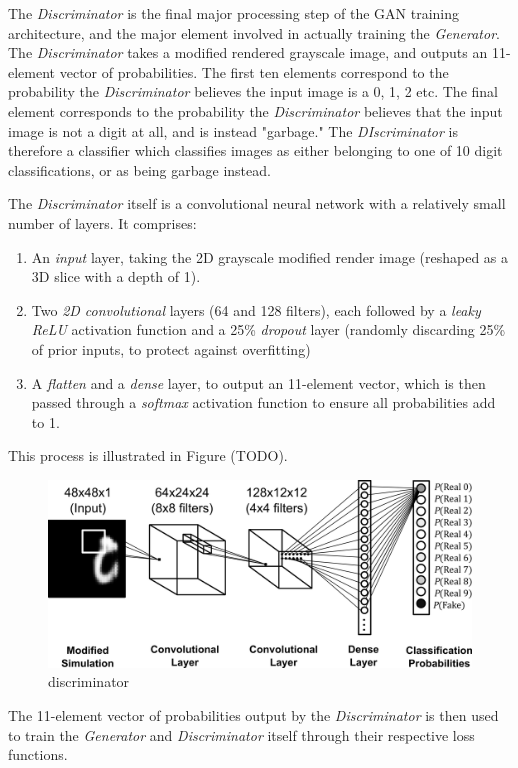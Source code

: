 \documentclass[a4paper,11pt,openany]{book}
\begin{document}
The \emph{Discriminator} is the final major processing step of the GAN training architecture, and the major element involved in actually training the \emph{Generator}.
The \emph{Discriminator} takes a modified rendered grayscale image, and outputs an 11-element vector of probabilities.
The first ten elements correspond to the probability the \emph{Discriminator} believes the input image is a 0, 1, 2 etc.
The final element corresponds to the probability the \emph{Discriminator} believes that the input image is not a digit at all, and is instead "garbage."
The \emph{DIscriminator} is therefore a classifier which classifies images as either belonging to one of 10 digit classifications, or as being garbage instead.

The \emph{Discriminator} itself is a convolutional neural network with a relatively small number of layers. It comprises:
\begin{enumerate}
\item An \emph{input} layer, taking the 2D grayscale modified render image (reshaped as a 3D slice with a depth of 1).
\item Two \emph{2D convolutional} layers (64 and 128 filters), each followed by a \emph{leaky ReLU} activation function and a 25\% \emph{dropout} layer (randomly discarding 25\% of prior inputs, to protect against overfitting)
\item A \emph{flatten} and a \emph{dense} layer, to output an 11-element vector, which is then passed through a \emph{softmax} activation function to ensure all probabilities add to 1.
\end{enumerate}
This process is illustrated in Figure (TODO).


\begin{figure}[htbp]
\centering
\includegraphics[width=.9\linewidth]{./images/methods_discriminator.png}
\caption{\label{fig:org054406b}
discriminator}
\end{figure}


The 11-element vector of probabilities output by the \emph{Discriminator} is then used to train the \emph{Generator} and \emph{Discriminator} itself through their respective loss functions.
\end{document}
